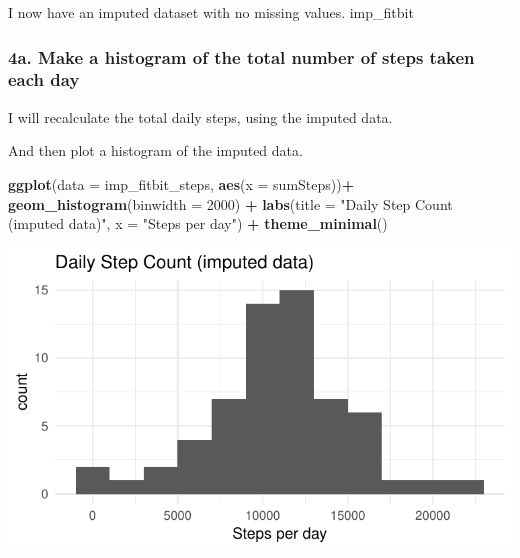 \documentclass[]{article}
\newenvironment{Shaded}{\begin{snugshade}}{\end{snugshade}}
\newcommand{\KeywordTok}[1]{\textcolor[rgb]{0.13,0.29,0.53}{\textbf{#1}}}
\newcommand{\DataTypeTok}[1]{\textcolor[rgb]{0.13,0.29,0.53}{#1}}
\newcommand{\DecValTok}[1]{\textcolor[rgb]{0.00,0.00,0.81}{#1}}
\newcommand{\StringTok}[1]{\textcolor[rgb]{0.31,0.60,0.02}{#1}}
\newcommand{\OperatorTok}[1]{\textcolor[rgb]{0.81,0.36,0.00}{\textbf{#1}}}
\newcommand{\NormalTok}[1]{#1}
\begin{document}
I now have an imputed dataset with no missing values. imp\_fitbit

\subsubsection{4a. Make a histogram of the total number of steps taken
each
day}\label{a.-make-a-histogram-of-the-total-number-of-steps-taken-each-day}

I will recalculate the total daily steps, using the imputed data.

\begin{Shaded}
\end{Shaded}

And then plot a histogram of the imputed data.

\begin{Shaded}
\begin{Highlighting}[]
\KeywordTok{ggplot}\NormalTok{(}\DataTypeTok{data =}\NormalTok{ imp_fitbit_steps, }\KeywordTok{aes}\NormalTok{(}\DataTypeTok{x =}\NormalTok{ sumSteps))}\OperatorTok{+}
\StringTok{      }\KeywordTok{geom_histogram}\NormalTok{(}\DataTypeTok{binwidth =} \DecValTok{2000}\NormalTok{) }\OperatorTok{+}
\StringTok{      }\KeywordTok{labs}\NormalTok{(}\DataTypeTok{title =} \StringTok{"Daily Step Count (imputed data)"}\NormalTok{, }\DataTypeTok{x =} \StringTok{"Steps per day"}\NormalTok{)  }\OperatorTok{+}
\StringTok{      }\KeywordTok{theme_minimal}\NormalTok{()}
\end{Highlighting}
\end{Shaded}

\includegraphics{PA1_template_files/figure-latex/dailyStepsHistogramImputed-1.pdf}
\end{document}

